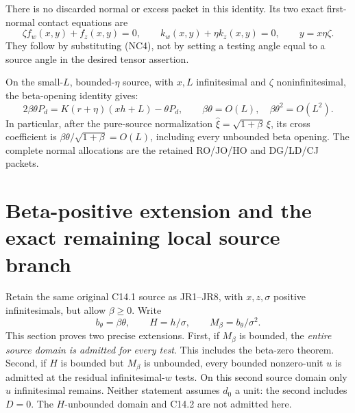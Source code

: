 There is no discarded normal or excess packet in this identity.
Its two exact first-normal contact equations are
\[
 \zeta f_w(x,y)+f_z(x,y)=0,\qquad
 k_w(x,y)+\eta k_z(x,y)=0,\qquad y=x\eta\zeta.             \tag{SN3}
\]
They follow by substituting (NC4), not by setting a testing angle
equal to a source angle in the desired tensor assertion.

On the small-$L$, bounded-$\eta$ source, with $x,L$ infinitesimal
and $\zeta$ noninfinitesimal, the beta-opening identity gives:
\[
 2\beta\theta P_d=K(r+\eta)(xh+L)-\theta P_d,
 \qquad \beta\theta=O(L),\quad \beta\theta^2=O(L^2).       \tag{SN4}
\]
In particular, after the pure-source normalization
$\widehat\xi=\sqrt{1+\beta}\,\xi$, its cross coefficient is
$\beta\theta/\sqrt{1+\beta}=O(L)$, including every unbounded
beta opening.  The complete normal allocations are the retained
RO/JO/HO and DG/LD/CJ packets.


\section{\texorpdfstring{Beta-positive extension and the exact remaining local source branch}{Beta-positive extension and the exact remaining local source branch}}
\label{component:p909aa5765721}

\label{p909aa5765721:sec:r13-beta-positive-extension}

Retain the same original C14.1 source as JR1--JR8, with $x,z,\sigma$
positive infinitesimals, but allow $\beta\ge0$. Write
\[
 b_\theta=\beta\theta,\qquad H=h/\sigma,\qquad
 M_\beta=b_\theta/\sigma^2.
\]
This section proves two precise extensions. First, if $M_\beta$ is
bounded, the \emph{entire source domain is admitted for every test}.
This includes the beta-zero theorem. Second, if $H$ is bounded but
$M_\beta$ is unbounded, every bounded nonzero-unit $u$ is admitted
at the residual infinitesimal-$w$ tests. On this second source domain
only $u$ infinitesimal remains. Neither statement assumes $d_0$ a
unit: the second includes $D=0$. The $H$-unbounded domain and C14.2
are not admitted here.

